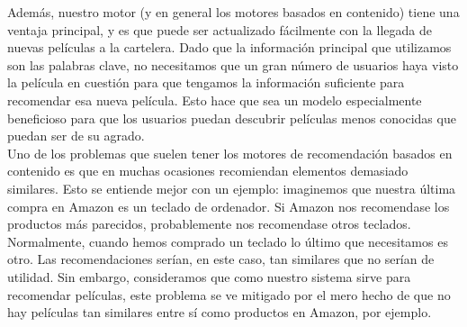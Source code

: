 Además, nuestro motor (y en general los motores basados en contenido) tiene una ventaja principal, y es que puede ser actualizado fácilmente con la llegada de nuevas películas a la cartelera. Dado que la información principal que utilizamos son las palabras clave, no necesitamos que un gran número de usuarios haya visto la película en cuestión para que tengamos la información suficiente para recomendar esa nueva película. Esto hace que sea un modelo especialmente beneficioso para que los usuarios puedan descubrir películas menos conocidas que puedan ser de su agrado.\\

Uno de los problemas que suelen tener los motores de recomendación basados en contenido es que en muchas ocasiones recomiendan elementos demasiado similares. Esto se entiende mejor con un ejemplo: imaginemos que nuestra última compra en Amazon es un teclado de ordenador. Si Amazon nos recomendase los productos más parecidos, probablemente nos recomendase otros teclados. Normalmente, cuando hemos comprado un teclado lo último que necesitamos es otro. Las recomendaciones serían, en este caso, tan similares que no serían de utilidad. Sin embargo, consideramos que como nuestro sistema sirve para recomendar películas, este problema se ve mitigado por el mero hecho de que no hay películas tan similares entre sí como productos en Amazon, por ejemplo.


    

